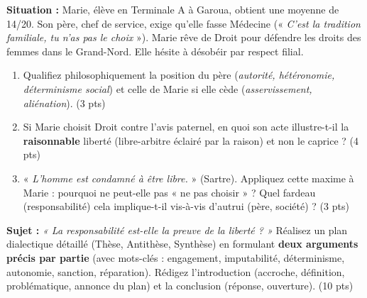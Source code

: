 \documentclass[11pt]{article}
\begin{document}
\begin{exercice}
\textbf{Situation :} Marie, élève en Terminale A à Garoua, obtient une moyenne de 14/20. Son père, chef de service, exige qu'elle fasse Médecine (« \textit{C'est la tradition familiale, tu n'as pas le choix} »). Marie rêve de Droit pour défendre les droits des femmes dans le Grand-Nord. Elle hésite à désobéir par respect filial.
\begin{enumerate}
    \item Qualifiez philosophiquement la position du père (\textit{autorité, hétéronomie, déterminisme social}) et celle de Marie si elle cède (\textit{asservissement, aliénation}). \hfill (3 pts)
    \item Si Marie choisit Droit contre l'avis paternel, en quoi son acte illustre-t-il la \textbf{raisonnable} liberté (libre-arbitre éclairé par la raison) et non le caprice ? \hfill (4 pts)
    \item « \textit{L'homme est condamné à être libre.} » (Sartre). Appliquez cette maxime à Marie : pourquoi ne peut-elle pas « ne pas choisir » ? Quel fardeau (responsabilité) cela implique-t-il vis-à-vis d'autrui (père, société) ? \hfill (3 pts)
\end{enumerate}
\end{exercice}

\begin{exercice}
\textbf{Sujet :} \textit{« La responsabilité est-elle la preuve de la liberté ? »}
Réalisez un plan dialectique détaillé (Thèse, Antithèse, Synthèse) en formulant \textbf{deux arguments précis par partie} (avec mots-clés : engagement, imputabilité, déterminisme, autonomie, sanction, réparation). Rédigez l'introduction (accroche, définition, problématique, annonce du plan) et la conclusion (réponse, ouverture). \hfill (10 pts)
\end{exercice}
\end{document}
